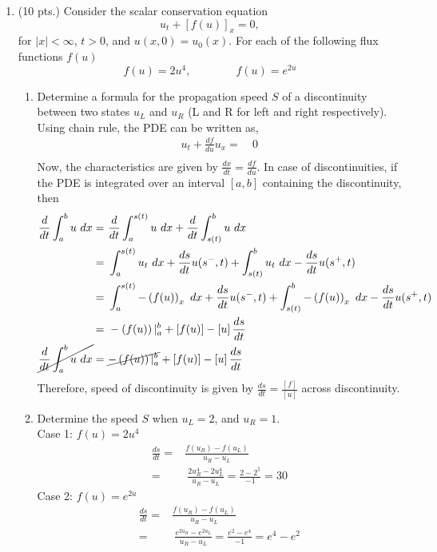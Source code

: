 \documentclass[11pt]{article}
\newcommand{\bra}[1]{\left(#1\right)}
\begin{document}
\begin{enumerate}
  \item {\color{red}(10 pts.) Consider the scalar conservation equation}
    \[
      u_t+[f(u)]_x=0,
    \]
    {\color{red}for $|x|<\infty$, $t>0$, and $u(x,0) = u_0(x)$. For each of the following flux functions $f(u)$}
    \[
      f(u) = 2u^4, \qquad \qquad f(u) = e^{2u}
    \]
    \begin{enumerate}
      \item {\color{blue}Determine a formula for the propagation speed $S$ of a discontinuity between two states $u_L$ and $u_R$ (L and R for left and right respectively).}\\
      Using chain rule, the PDE can be written as,
      \begin{align*}
          u_t + \frac{df}{du}u_x =& \ 0 \\
      \end{align*}
      Now, the characteristics are given by $\frac{dx}{dt} = \frac{df}{du}$.
      In case of discontinuities, if the PDE is integrated over an interval $[a,b]$ containing the discontinuity, then
      \begin{align*}
          \frac{d}{dt}\int_a^b u\ dx =& \ \frac{d}{dt}\int_a^{s(t)} u\ dx + \frac{d}{dt}\int_{s(t)}^b u\ dx  \\
          =& \ \int_a^{s(t)}u_t\ dx + \frac{ds}{dt}u(s^{-},t) + \int_{s(t)}^b u_t\ dx - \frac{ds}{dt}u(s^{+},t) \\
          =& \ \int_a^{s(t)}-\bra{f(u)}_x\ dx + \frac{ds}{dt}u(s^{-},t) + \int_{s(t)}^b -\bra{f(u)}_x\ dx - \frac{ds}{dt}u(s^{+},t) \\
          =& \ -\bra{f(u)}|_a^b + \left[f(u)\right] - \left[u\right]\frac{ds}{dt} \\
          \cancel{\frac{d}{dt}\int_a^b u\ dx} =& \ \cancel{-\bra{f(u)}|_a^b} + \left[f(u)\right] - \left[u\right]\frac{ds}{dt}
      \end{align*}
      Therefore, speed of discontinuity is given by $\frac{ds}{dt}=\frac{[f]}{[u]} $ across discontinuity.
      \item {\color{blue}Determine the speed $S$ when $u_L = 2$, and $u_R=1$.}\\
      Case 1: $f(u) = 2u^4$
      \begin{align*}
          \frac{ds}{dt} =& \frac{f(u_R)-f(u_L)}{u_R-u_L} \\
          =& \ \frac{2u_R^4 - 2u_L^4}{u_R - u_L} = \frac{2-2^5}{-1} = 30
      \end{align*}
      Case 2: $f(u)=e^{2u}$
      \begin{align*}
          \frac{ds}{dt} =& \frac{f(u_R)-f(u_L)}{u_R-u_L} \\
          =& \ \frac{e^{2u_R}-e^{2u_L}}{u_R-u_L} = \frac{e^2-e^4}{-1} = e^4 - e^2
      \end{align*}
    \end{enumerate}


\end{enumerate}
\end{document}
